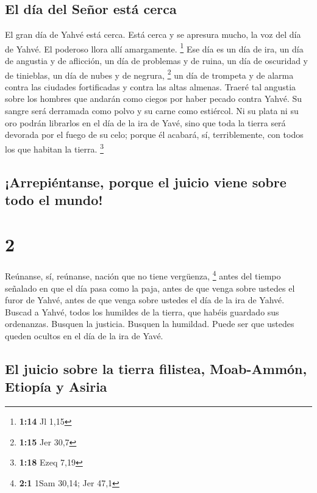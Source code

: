\hypertarget{el-duxeda-del-seuxf1or-estuxe1-cerca}{%
\subsection{El día del Señor está
cerca}\label{el-duxeda-del-seuxf1or-estuxe1-cerca}}

 El gran día de Yahvé está cerca. Está cerca y se
apresura mucho, la voz del día de Yahvé. El poderoso llora allí
amargamente. \footnote{\textbf{1:14} Jl 1,15}  Ese día es
un día de ira, un día de angustia y de aflicción, un día de problemas y
de ruina, un día de oscuridad y de tinieblas, un día de nubes y de
negrura, \footnote{\textbf{1:15} Jer 30,7}  un día de
trompeta y de alarma contra las ciudades fortificadas y contra las altas
almenas.  Traeré tal angustia sobre los hombres que
andarán como ciegos por haber pecado contra Yahvé. Su sangre será
derramada como polvo y su carne como estiércol.  Ni su
plata ni su oro podrán librarlos en el día de la ira de Yavé, sino que
toda la tierra será devorada por el fuego de su celo; porque él acabará,
sí, terriblemente, con todos los que habitan la tierra. \footnote{\textbf{1:18}
  Ezeq 7,19}

\hypertarget{arrepiuxe9ntanse-porque-el-juicio-viene-sobre-todo-el-mundo}{%
\subsection{¡Arrepiéntanse, porque el juicio viene sobre todo el
mundo!}\label{arrepiuxe9ntanse-porque-el-juicio-viene-sobre-todo-el-mundo}}

\hypertarget{section-1}{%
\section{2}\label{section-1}}

 Reúnanse, sí, reúnanse, nación que no tiene vergüenza,
\footnote{\textbf{2:1} 1Sam 30,14; Jer 47,1}  antes del
tiempo señalado en que el día pasa como la paja, antes de que venga
sobre ustedes el furor de Yahvé, antes de que venga sobre ustedes el día
de la ira de Yahvé.  Buscad a Yahvé, todos los humildes de
la tierra, que habéis guardado sus ordenanzas. Busquen la justicia.
Busquen la humildad. Puede ser que ustedes queden ocultos en el día de
la ira de Yavé.

\hypertarget{el-juicio-sobre-la-tierra-filistea-moab-ammuxf3n-etiopuxeda-y-asiria}{%
\subsection{El juicio sobre la tierra filistea, Moab-Ammón, Etiopía y
Asiria}\label{el-juicio-sobre-la-tierra-filistea-moab-ammuxf3n-etiopuxeda-y-asiria}}

